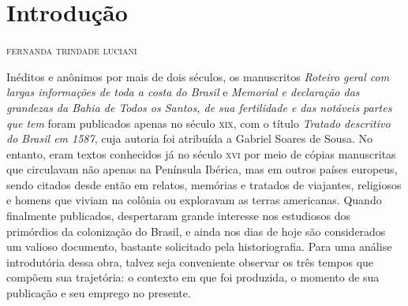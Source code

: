 \chapter[Introdução, \emph{por Fernanda Trindade Luciani}]{Introdução}

\begin{flushright}
\textsc{fernanda trindade luciani}
\end{flushright}

\noindent{}Inéditos e anônimos por mais de dois
séculos, os manuscritos \textit{\mbox{Roteiro} geral com largas informações de
toda a costa do Brasil} e \textit{Memorial e declaração das grandezas
da Bahia de Todos os Santos, de sua fertilidade e das notáveis partes
que tem} foram publicados apenas no século \textsc{xix}, com o título 
\textit{Tratado descritivo do Brasil em 1587}, cuja autoria foi atribuída a
Gabriel Soares de Sousa. No entanto, eram textos conhecidos já no
século \textsc{xvi} por meio de cópias manuscritas que circulavam não apenas na
Península Ibérica, mas em outros países europeus, sendo citados desde
então em relatos, memórias e tratados de viajantes, religiosos e homens
que viviam na colônia ou exploravam as terras americanas. Quando
finalmente publicados, despertaram grande interesse nos estudiosos dos
primórdios da colonização do Brasil, e ainda nos dias de hoje são
considerados um valioso documento, bastante solicitado pela
historiografia. Para uma análise introdutória dessa obra, talvez seja
conveniente observar os três tempos que compõem sua trajetória: o
contexto em que foi produzida, o momento de sua publicação e seu
emprego no presente.

